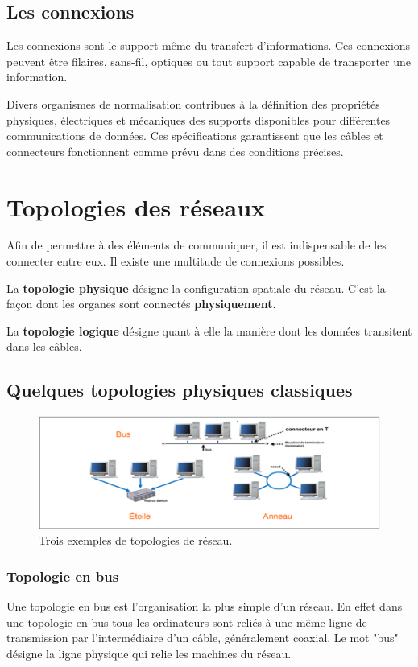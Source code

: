\documentclass[10pt,fleqn]{article} %
\begin{document}
\subsection{Les connexions}
\begin{defi}
  Les connexions sont le support même du transfert d'informations. Ces connexions peuvent être filaires, sans-fil, optiques ou tout support capable de transporter une information.
\end{defi}
Divers organismes de normalisation contribues à la définition des propriétés physiques, électriques et mécaniques des supports disponibles pour différentes communications de données.
Ces spécifications garantissent que les câbles et connecteurs fonctionnent comme prévu dans des conditions précises.


\section{Topologies des réseaux}
Afin de permettre à des éléments de communiquer, il est indispensable de les connecter entre eux. Il existe une multitude de connexions possibles.
\begin{defi}
  La \textbf{topologie physique} désigne la configuration spatiale du réseau. C'est la façon dont les organes sont connectés \textbf{physiquement}.
\end{defi}
\begin{defi}
  La \textbf{topologie logique} désigne quant à elle la manière dont les données transitent dans les câbles.
\end{defi}

\subsection{Quelques topologies physiques classiques}
\begin{figure}[h]
  \centering
  \includegraphics[width=.7\textwidth]{img/reseau_topologies}
  \caption{Trois exemples de topologies de réseau.}
  \label{fig:res_topo}
\end{figure}
\subsubsection{Topologie en bus}
Une topologie en bus est l'organisation la plus simple d'un réseau. En effet dans une topologie en bus tous les ordinateurs sont reliés à une même ligne de transmission par l'intermédiaire d'un câble, généralement coaxial. Le mot "bus" désigne la ligne physique qui relie les machines du réseau.
\end{document}
